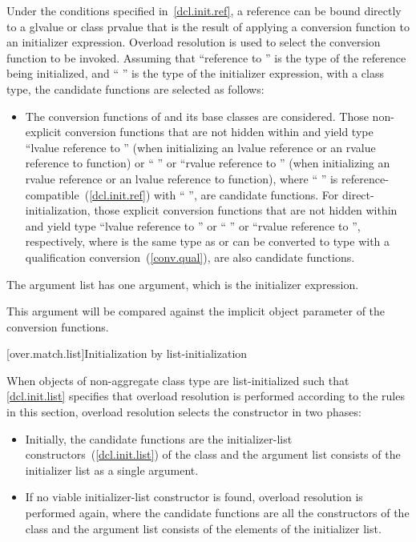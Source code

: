 \pnum
Under the conditions specified in~\ref{dcl.init.ref}, a reference can be bound directly
to a glvalue or class prvalue that is the result of applying a conversion
function to an initializer expression.
Overload resolution is used to select the
conversion function to be invoked.
Assuming that ``reference to  '' is the
type of the reference being initialized, and
``\cv{} '' is the type
of the initializer expression, with
a class type,
the candidate functions are selected as follows:
\begin{itemize}
\item
The conversion functions of
and its base classes are considered.
Those non-explicit conversion functions that are not hidden within
and yield type ``lvalue reference to  ''
(when initializing an lvalue reference or an rvalue reference to function) or
`` ''
or ``rvalue reference to  '' (when initializing an
rvalue reference or an lvalue reference to function),
where `` '' is reference-compatible~(\ref{dcl.init.ref})
with `` '',
are candidate functions. For direct-initialization, those explicit
conversion functions that are not hidden within  and yield
type ``lvalue reference to  '' or ``
'' or ``rvalue reference to  '',
respectively, where  is the same type as  or can be
converted to type  with a qualification
conversion~(\ref{conv.qual}), are also candidate functions.

\end{itemize}

\pnum
The argument list has one argument, which is the initializer expression.
\begin{note}
This argument will be compared against
the implicit object parameter of the conversion functions.
\end{note}

[over.match.list]{Initialization by list-initialization}%

\pnum
When objects of non-aggregate class type  are
list-initialized such that \ref{dcl.init.list} specifies that overload resolution
is performed according to the rules in this section, overload resolution selects the
constructor in two phases:

\begin{itemize}
\item
Initially, the candidate functions are the initializer-list constructors~(\ref{dcl.init.list})
of the class  and
the argument list consists of the initializer list as a single argument.

\item
If no viable initializer-list constructor is found, overload resolution is
performed again, where the candidate functions are all the constructors of
the class  and
the argument list consists of the elements of the initializer list.
\end{itemize}%
%

